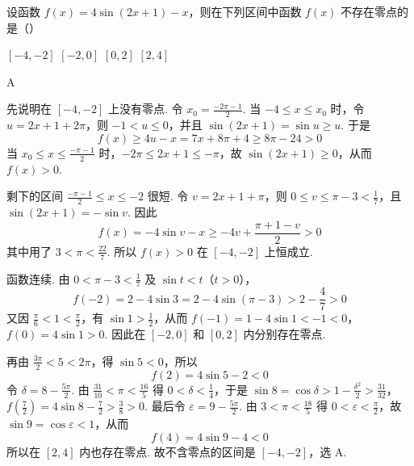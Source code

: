 \begin{problem}
设函数 \( f(x) = 4\sin (2x + 1) - x \)，则在下列区间中函数 \( f(x) \) 不存在零点的是（\quad）

\choices
    {\([-4, -2]\)}
    {\([-2,0]\)}
    {\([0,2]\)}
    {\([2,4]\)}
\begin{answer}
A
\end{answer}

\begin{solution}
先说明在 \([-4,-2]\) 上没有零点. 令 \(x_0=\frac{-2\pi-1}{2}\). 当 \(-4\leqslant x\leqslant x_0\) 时，令 \(u=2x+1+2\pi\)，则 \(-1<u\leqslant0\)，并且 \(\sin(2x+1)=\sin u\geqslant u\). 于是
\[
f(x)\geqslant4u-x=7x+8\pi+4\geqslant8\pi-24>0
\]
当 \(x_0\leqslant x\leqslant\frac{-\pi-1}{2}\) 时，\(-2\pi\leqslant2x+1\leqslant-\pi\)，故 \(\sin(2x+1)\geqslant0\)，从而 \(f(x)>0\).

剩下的区间 \(\frac{-\pi-1}{2}\leqslant x\leqslant-2\) 很短. 令 \(v=2x+1+\pi\)，则 \(0\leqslant v\leqslant\pi-3<\frac17\)，且 \(\sin(2x+1)=-\sin v\). 因此
\[
f(x)=-4\sin v-x\geqslant-4v+\frac{\pi+1-v}{2}>0
\]
其中用了 \(3<\pi<\frac{22}{7}\). 所以 \(f(x)>0\) 在 \([-4,-2]\) 上恒成立.

函数连续. 由 \(0<\pi-3<\frac17\) 及 \(\sin t<t\)（\(t>0\)），
\[
f(-2)=2-4\sin3=2-4\sin(\pi-3)>2-\frac47>0
\]
又因 \(\frac{\pi}{6}<1<\frac{\pi}{2}\)，有 \(\sin1>\frac12\)，从而
\(f(-1)=1-4\sin1<-1<0\)，\(f(0)=4\sin1>0\).
因此在 \([-2,0]\) 和 \([0,2]\) 内分别存在零点.

再由 \(\frac{3\pi}{2}<5<2\pi\)，得 \(\sin5<0\)，所以
\[
f(2)=4\sin5-2<0
\]
令 \(\delta=8-\frac{5\pi}{2}\). 由 \(\frac{31}{10}<\pi<\frac{16}{5}\) 得 \(0<\delta<\frac14\)，于是
\(\sin8=\cos\delta>1-\frac{\delta^2}{2}>\frac{31}{32}\)，\(f\left(\frac72\right)=4\sin8-\frac72>\frac38>0\).
最后令 \(\varepsilon=9-\frac{5\pi}{2}\). 由 \(3<\pi<\frac{18}{5}\) 得 \(0<\varepsilon<\frac{\pi}{2}\)，故 \(\sin9=\cos\varepsilon<1\)，从而
\[
f(4)=4\sin9-4<0
\]
所以在 \([2,4]\) 内也存在零点. 故不含零点的区间是 \([-4,-2]\)，选 A.
\end{solution}
\end{problem}

